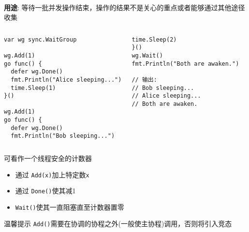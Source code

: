 \subsection{\WaitGroup}
\begin{frame}[fragile]{\WaitGroup}
   \textbf{用途}: 等待一批并发操作结束，\alert{操作的结果不是关心的重点或者能够通过其他途径收集} 

   \begin{columns}[t]
\begin{lstlisting}[xleftmargin=8pt]
var wg sync.WaitGroup

wg.Add(1)
go func() {
  defer wg.Done()
  fmt.Println("Alice sleeping...")
  time.Sleep(1)
}()

wg.Add(1)
go func() {
  defer wg.Done()
  fmt.Println("Bob sleeping...")
\end{lstlisting}

\begin{lstlisting}[firstnumber=last,xleftmargin=16pt]
  time.Sleep(2)
}()
wg.Wait()
fmt.Println("Both are awaken.")

// 输出:
// Bob sleeping...
// Alice sleeping...
// Both are awaken.
\end{lstlisting}
   \end{columns}
\end{frame}

\begin{frame}{\WaitGroup}
    \WaitGroup 可看作一个线程安全的计数器

    \begin{itemize}
        \item 通过 \texttt{Add(x)}加上特定数\texttt{x}
        \item 通过 \texttt{Done()}使其减1
        \item \texttt{Wait()}使其一直阻塞直至计数器置零
    \end{itemize}

    \begin{alertblock}{温馨提示}
        \texttt{Add()}需要在\WaitGroup 协调的协程之外(一般使主协程)调用，否则将引入\alert{竞态}
    \end{alertblock}
\end{frame}